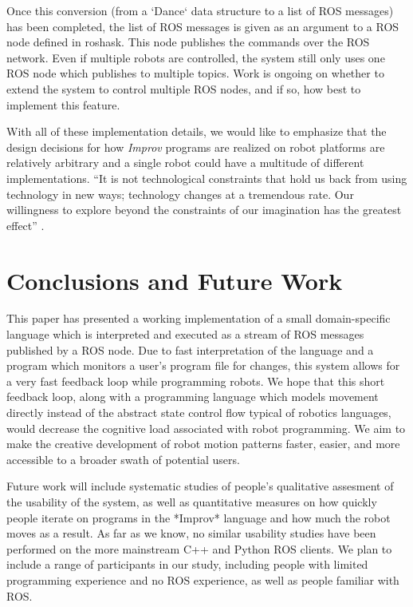 \documentclass[sigconf]{acmart}
\begin{document}
Once this conversion (from a `Dance` data structure to a list of ROS messages)
has been completed, the list of ROS messages is given as an argument to a ROS
node defined in roshask. This node publishes the commands over the ROS network.
Even if multiple robots are controlled, the system still only uses one ROS node
which publishes to multiple topics. Work is ongoing on whether to extend the
system to control multiple ROS nodes, and if so, how best to implement this
feature.

With all of these implementation details, we would like to emphasize
that the design decisions for how \emph{Improv} programs are realized on
robot platforms are relatively arbitrary and a single robot could have a
multitude of different implementations. ``It is not technological
constraints that hold us back from using technology in new ways;
technology changes at a tremendous rate. Our willingness to explore
beyond the constraints of our imagination has the greatest effect''
\cite{schiphorst}.


\section{Conclusions and Future
Work}\label{conclusions-and-future-work}

This paper has presented a working implementation of a small domain-specific
language which is interpreted and executed as a stream of ROS messages published
by a ROS node. Due to fast interpretation of the language and a program which
monitors a user's program file for changes, this system allows for a very fast
feedback loop while programming robots. We hope that this short feedback loop,
along with a programming language which models movement directly instead of the
abstract state control flow typical of robotics languages, would decrease the
cognitive load associated with robot programming. We aim to make the creative
development of robot motion patterns faster, easier, and more accessible to a
broader swath of potential users.

Future work will include systematic studies of people's qualitative assesment of
the usability of the system, as well as quantitative measures on how quickly
people iterate on programs in the *Improv* language and how much the robot moves
as a result. As far as we know, no similar usability studies have been performed
on the more mainstream C++ and Python ROS clients. We plan to include a range of
participants in our study, including people with limited programming experience
and no ROS experience, as well as people familiar with ROS.
\end{document}
